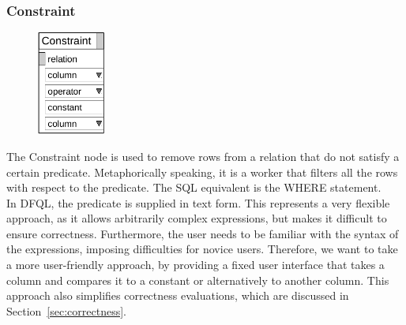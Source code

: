 \documentclass[11pt,a4paper]{globis-book}
\begin{document}
\subsubsection*{Constraint}
\begin{figure}
  \vspace{-13pt}
  \includegraphics[width=0.2\textwidth]{resources/ConstraintBasic.pdf}
  \vspace{-5pt}
\end{figure}
The Constraint node is used to remove rows from a relation that do not satisfy a certain predicate. Metaphorically speaking, it is a worker that filters all the rows with respect to the predicate. The SQL equivalent is the WHERE statement.\\
In DFQL, the predicate is supplied in text form. This represents a very flexible approach, as it allows arbitrarily complex expressions, but makes it difficult to ensure correctness. Furthermore, the user needs to be familiar with the syntax of the expressions, imposing difficulties for novice users. Therefore, we want to take a more user-friendly approach, by providing a fixed user interface that takes a column and compares it to a constant or alternatively to another column. This approach also simplifies correctness evaluations, which are discussed in Section~\ref{sec:correctness}.
\end{document}
